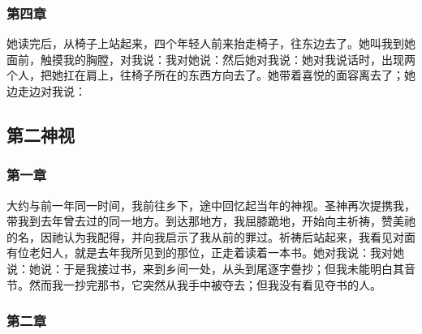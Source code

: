 
\subsubsection{第四章}

她读完后，从椅子上站起来，四个年轻人前来抬走椅子，往东边去了。她叫我到她面前，触摸我的胸膛，对我说：我对她说：然后她对我说：她对我说话时，出现两个人，把她扛在肩上，往椅子所在的东西方向去了。她带着喜悦的面容离去了；她边走边对我说：\par


\subsection{第二神视}

\par


\subsubsection{第一章}

大约与前一年同一时间，我前往乡下，途中回忆起当年的神视。圣神再次提携我，带我到去年曾去过的同一地方。到达那地方，我屈膝跪地，开始向主祈祷，赞美祂的名，因祂认为我配得，并向我启示了我从前的罪过。祈祷后站起来，我看见对面有位老妇人，就是去年我所见到的那位，正走着读着一本书。她对我说：我对她说：她说：于是我接过书，来到乡间一处，从头到尾逐字誊抄；但我未能明白其音节。然而我一抄完那书，它突然从我手中被夺去；但我没有看见夺书的人。\par


\subsubsection{第二章}

